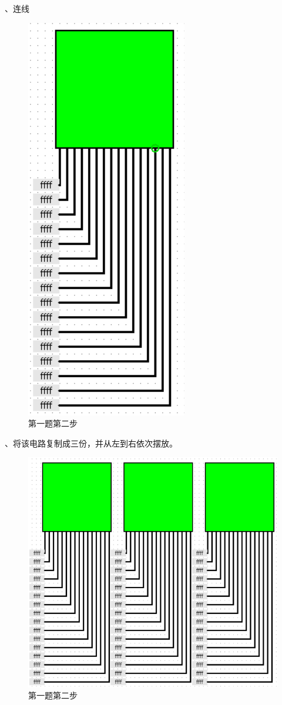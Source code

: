 \documentclass[UTF8]{ctexart}
\begin{document}
、连线
\begin{figure}[h!]
    \centering
    \includegraphics[scale=0.6]{p1_s2.PNG}
    \caption{第一题第二步}
\end{figure}
、将该电路复制成三份，并从左到右依次摆放。
\begin{figure}[h!]
    \centering
    \includegraphics[scale=0.6]{p1_s3.PNG}
    \caption{第一题第二步}
\end{figure}
\end{document}
